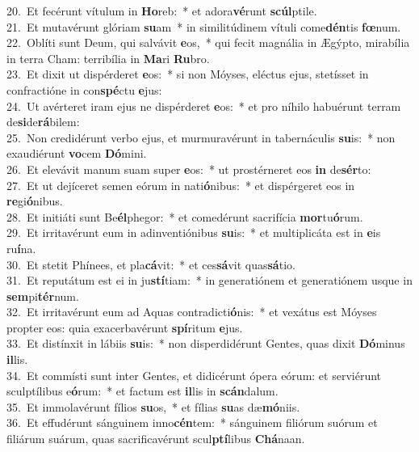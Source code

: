 {20.~}Et fecérunt vítulum in \textbf{Ho}reb:~* et adora\textbf{vé}runt \textbf{scúl}ptile.\\
{21.~}Et mutavérunt glóriam \textbf{su}am~* in similitúdinem vítuli come\textbf{dén}tis \textbf{fœ}num.\\
{22.~}Oblíti sunt Deum, qui salvávit \textbf{e}os,~* qui fecit magnália in Ægýpto, mirabília in terra Cham: terribília in \textbf{Ma}ri \textbf{Ru}bro.\\
{23.~}Et dixit ut dispérderet \textbf{e}os:~* si non Móyses, eléctus ejus, stetísset in confractióne in con\textbf{spé}ctu \textbf{e}jus:\\
{24.~}Ut avérteret iram ejus ne dispérderet \textbf{e}os:~* et pro níhilo habuérunt terram de\textbf{si}de\textbf{rá}bilem:\\
{25.~}Non credidérunt verbo ejus, et murmuravérunt in tabernáculis \textbf{su}is:~* non exaudiérunt \textbf{vo}cem \textbf{Dó}mini.\\
{26.~}Et elevávit manum suam super \textbf{e}os:~* ut prostérneret eos \textbf{in} de\textbf{sér}to:\\
{27.~}Et ut dejíceret semen eórum in nati\textbf{ó}nibus:~* et dispérgeret eos in \textbf{re}gi\textbf{ó}nibus.\\
{28.~}Et initiáti sunt Be\textbf{él}phegor:~* et comedérunt sacrifícia \textbf{mor}tu\textbf{ó}rum.\\
{29.~}Et irritavérunt eum in adinventiónibus \textbf{su}is:~* et multiplicáta est in \textbf{e}is ru\textbf{í}na.\\
{30.~}Et stetit Phínees, et pla\textbf{cá}vit:~* et ces\textbf{sá}vit quas\textbf{sá}tio.\\
{31.~}Et reputátum est ei in ju\textbf{stí}tiam:~* in generatiónem et generatiónem usque in \textbf{sem}pi\textbf{tér}num.\\
{32.~}Et irritavérunt eum ad Aquas contradicti\textbf{ó}nis:~* et vexátus est Móyses propter eos: quia exacerbavérunt \textbf{spí}ritum \textbf{e}jus.\\
{33.~}Et distínxit in lábiis \textbf{su}is:~* non disperdidérunt Gentes, quas dixit \textbf{Dó}minus \textbf{il}lis.\\
{34.~}Et commísti sunt inter Gentes, et didicérunt ópera eórum: et serviérunt sculptílibus e\textbf{ó}rum:~* et factum est \textbf{il}lis in \textbf{scán}dalum.\\
{35.~}Et immolavérunt fílios \textbf{su}os,~* et fílias \textbf{su}as dæ\textbf{mó}niis.\\
{36.~}Et effudérunt sánguinem inno\textbf{cén}tem:~* sánguinem filiórum suórum et filiárum suárum, quas sacrificavérunt scul\textbf{ptí}libus \textbf{Chá}naan.\\
